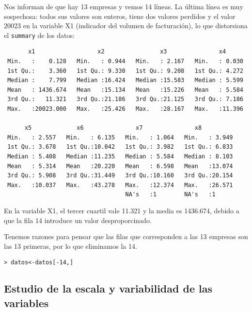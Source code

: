 \documentclass[12pt]{article}
\begin{document}
Nos informan de que hay 13 empresas y vemos 14 líneas. La última línea
es muy sospechosa: todos sus valores son enteros, tiene dos valores
perdidos y el valor 20023 en la variable X1 (indicador del volumen de
facturación), lo que distorsiona el \texttt{summary} de los datos:
\begin{verbatim}
       x1                  x2                x3               x4            
 Min.   :    0.128   Min.   : 0.944   Min.   : 2.167   Min.   : 0.030     
 1st Qu.:    3.360   1st Qu.: 9.330   1st Qu.: 9.208   1st Qu.: 4.272     
 Median :    7.799   Median :16.424   Median :15.583   Median : 5.599     
 Mean   : 1436.674   Mean   :15.134   Mean   :15.226   Mean   : 5.584     
 3rd Qu.:   11.321   3rd Qu.:21.186   3rd Qu.:21.125   3rd Qu.: 7.186     
 Max.   :20023.000   Max.   :25.426   Max.   :28.167   Max.   :11.396   
                                               
      x5             x6               x7               x8        
 Min.   : 2.557   Min.   : 6.135   Min.   : 1.064   Min.   : 3.949  
 1st Qu.: 3.678   1st Qu.:10.042   1st Qu.: 3.982   1st Qu.: 6.833  
 Median : 5.408   Median :11.235   Median : 5.584   Median : 8.103  
 Mean   : 5.314   Mean   :20.220   Mean   : 6.598   Mean   :13.074  
 3rd Qu.: 5.908   3rd Qu.:31.449   3rd Qu.:10.160   3rd Qu.:20.154  
 Max.   :10.037   Max.   :43.278   Max.   :12.374   Max.   :26.571  
                                   NA's   :1        NA's   :1   
\end{verbatim}

En la variable X1, el tercer cuartil vale 11.321 y la media es
1436.674, debido a que la fila 14 introduce un valor desproporcinado.

Tenemos razones para pensar que las filas que corresponden a las 13
empresas son las 13 primeras, por lo que eliminamos la 14.
\begin{verbatim}
> datos<-datos[-14,]
\end{verbatim}

\subsection{Estudio de la escala y variabilidad de las variables}
\end{document}
